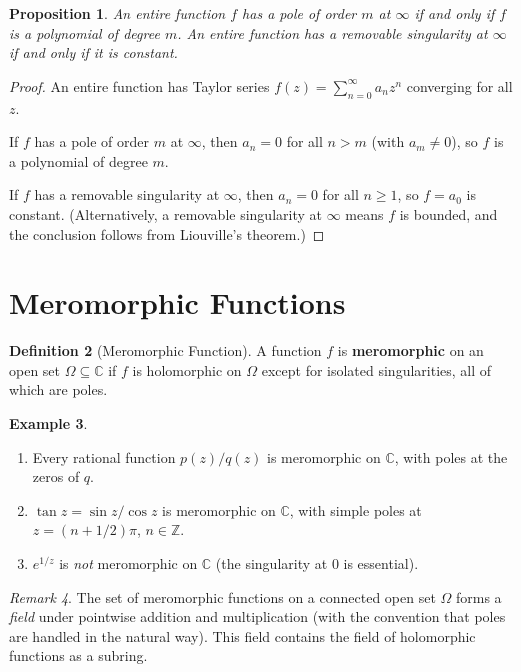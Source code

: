 \documentclass[12pt,a4paper,openany]{book}
\theoremstyle{definition}
\newtheorem{definition}{Definition}[chapter]
\newtheorem{example}[definition]{Example}
\theoremstyle{plain}
\newtheorem{proposition}[definition]{Proposition}
\theoremstyle{remark}
\newtheorem{remark}[definition]{Remark}
\newcommand{\C}{\mathbb{C}}
\newcommand{\Z}{\mathbb{Z}}
\begin{document}
\begin{proposition}\label{prop:entire-singularity-infinity}
An entire function $f$ has a pole of order $m$ at $\infty$ if and only if $f$ is
a polynomial of degree $m$. An entire function has a removable singularity at
$\infty$ if and only if it is constant.
\end{proposition}

\begin{proof}
An entire function has Taylor series $f(z)=\sum_{n=0}^{\infty}a_n z^n$ converging
for all $z$.

If $f$ has a pole of order $m$ at $\infty$, then $a_n=0$ for all $n>m$
(with $a_m\ne 0$), so $f$ is a polynomial of degree $m$.

If $f$ has a removable singularity at $\infty$, then $a_n=0$ for all $n\ge 1$,
so $f=a_0$ is constant. (Alternatively, a removable singularity at $\infty$ means
$f$ is bounded, and the conclusion follows from Liouville's theorem.)
\end{proof}

\section{Meromorphic Functions}
\label{sec:meromorphic}

\begin{definition}[Meromorphic Function]\label{def:meromorphic}
A function $f$ is \textbf{meromorphic} on an open set $\Omega\subseteq\C$ if
$f$ is holomorphic on $\Omega$ except for isolated singularities, all of which
are poles.
\end{definition}

\begin{example}\label{ex:meromorphic}
\begin{enumerate}[label=(\alph*)]
  \item Every rational function $p(z)/q(z)$ is meromorphic on $\C$, with poles at
    the zeros of $q$.
  \item $\tan z = \sin z / \cos z$ is meromorphic on $\C$, with simple poles at
    $z=(n+1/2)\pi$, $n\in\Z$.
  \item $e^{1/z}$ is \emph{not} meromorphic on $\C$ (the singularity at $0$ is essential).
\end{enumerate}
\end{example}

\begin{remark}\label{rem:meromorphic-field}
The set of meromorphic functions on a connected open set $\Omega$ forms a
\emph{field} under pointwise addition and multiplication (with the convention
that poles are handled in the natural way). This field contains the field of
holomorphic functions as a subring.
\end{remark}
\end{document}
